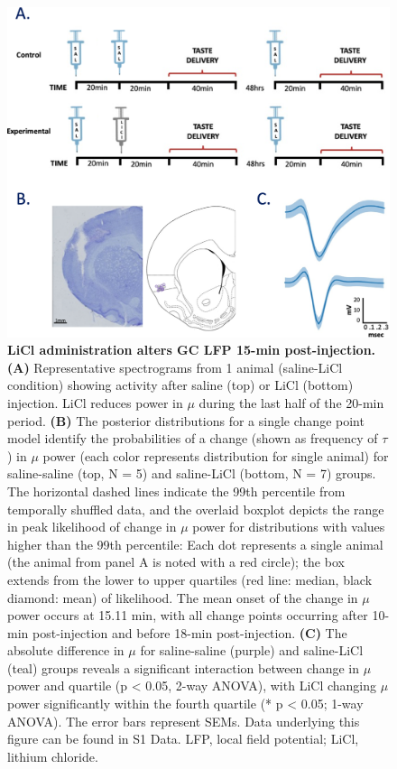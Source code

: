 \begin{refsection}
\begin{figure}
\includegraphics[width=\linewidth]{stone_2022_figs/journal.pbio.3001537.g001.png}
\caption{\textbf{LiCl administration alters GC LFP 15-min post-injection.}
\textbf{(A)} Representative spectrograms from 1 animal (saline-LiCl condition) showing activity after saline (top) or LiCl (bottom) injection. LiCl reduces power in \(\mu\) during the last half of the 20-min period. \textbf{(B)} The posterior distributions for a single change point model identify the probabilities of a change (shown as frequency of \(\tau\)) in \(\mu\) power (each color represents distribution for single animal) for saline-saline (top, N = 5) and saline-LiCl (bottom, N = 7) groups. The horizontal dashed lines indicate the 99th percentile from temporally shuffled data, and the overlaid boxplot depicts the range in peak likelihood of change in \(\mu\) power for distributions with values higher than the 99th percentile: Each dot represents a single animal (the animal from panel A is noted with a red circle); the box extends from the lower to upper quartiles (red line: median, black diamond: mean) of likelihood. The mean onset of the change in \(\mu\) power occurs at 15.11 min, with all change points occurring after 10-min post-injection and before 18-min post-injection. \textbf{(C)} The absolute difference in \(\mu\) for saline-saline (purple) and saline-LiCl (teal) groups reveals a significant interaction between change in \(\mu\) power and quartile (p < 0.05, 2-way ANOVA), with LiCl changing \(\mu\) power significantly within the fourth quartile (* p < 0.05; 1-way ANOVA). The error bars represent SEMs. Data underlying this figure can be found in S1 Data. LFP, local field potential; LiCl, lithium chloride.
}
\label{fig:wrapfig}
\end{figure}


\end{refsection}
